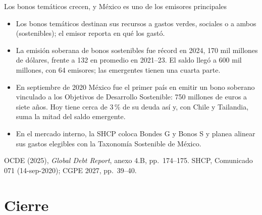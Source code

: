 \documentclass[aspectratio=169,11pt]{beamer}
\newcommand{\fuente}[1]{\par\vfill{\small\color{cGris}#1\par}}
\newcommand{\GDR}{OCDE (2025), \emph{Global Debt Report}}
\begin{document}
\begin{frame}{Los bonos temáticos crecen, y México es uno de los emisores principales}
  \small
  \begin{itemize}
    \item<1-> Los bonos temáticos destinan sus recursos a gastos verdes, sociales o a ambos (sostenibles); el emisor reporta en qué los gastó.
    \item<2-> La emisión soberana de bonos sostenibles fue récord en 2024, 170 mil millones de dólares, frente a 132 en promedio en 2021--23. El saldo llegó a 600 mil millones, con 64 emisores; las emergentes tienen una cuarta parte.
    \item<3-> En septiembre de 2020 México fue el primer país en emitir un bono soberano vinculado a los Objetivos de Desarrollo Sostenible: 750 millones de euros a siete años. Hoy tiene cerca de 3\,\% de su deuda así y, con Chile y Tailandia, suma la mitad del saldo emergente.
    \item<4-> En el mercado interno, la SHCP coloca Bondes G y Bonos S y planea alinear sus gastos elegibles con la Taxonomía Sostenible de México.
  \end{itemize}
  \vspace{-2mm}
  \fuente{\GDR, anexo 4.B, pp.~174--175. SHCP, Comunicado 071 (14-sep-2020); CGPE 2027, pp.~39--40.}
\end{frame}

\section{Cierre}
\end{document}
